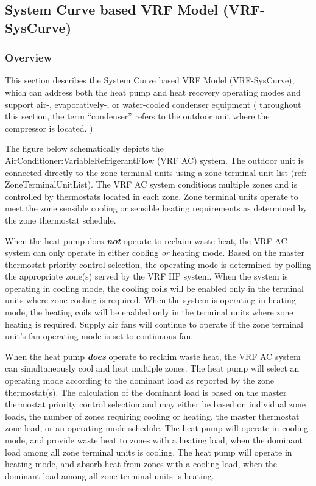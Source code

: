 \subsection{System Curve based VRF Model (VRF-SysCurve)}\label{variable-refrigerant-flow-heat-pump-model-system-curve-based-model}

\subsubsection{Overview}\label{overview-028}

This section describes the System Curve based VRF Model (VRF-SysCurve), which can address both the heat pump and heat recovery operating modes and support air-, evaporatively-, or water-cooled condenser equipment ( throughout this section, the term ``condenser'' refers to the outdoor unit where the compressor is located. )

The figure below schematically depicts the AirConditioner:VariableRefrigerantFlow (VRF AC) system. The outdoor unit is connected directly to the zone terminal units using a zone terminal unit list (ref: ZoneTerminalUnitList). The VRF AC system conditions multiple zones and is controlled by thermostats located in each zone. Zone terminal units operate to meet the zone sensible cooling or sensible heating requirements as determined by the zone thermostat schedule.

When the heat pump does \emph{\textbf{not}} operate to reclaim waste heat, the VRF AC system can only operate in either cooling \emph{or} heating mode. Based on the master thermostat priority control selection, the operating mode is determined by polling the appropriate zone(s) served by the VRF HP system. When the system is operating in cooling mode, the cooling coils will be enabled only in the terminal units where zone cooling is required. When the system is operating in heating mode, the heating coils will be enabled only in the terminal units where zone heating is required. Supply air fans will continue to operate if the zone terminal unit's fan operating mode is set to continuous fan.

When the heat pump \emph{\textbf{does}} operate to reclaim waste heat, the VRF AC system can simultaneously cool and heat multiple zones. The heat pump will select an operating mode according to the dominant load as reported by the zone thermostat(s). The calculation of the dominant load is based on the master thermostat priority control selection and may either be based on individual zone loads, the number of zones requiring cooling or heating, the master thermostat zone load, or an operating mode schedule. The heat pump will operate in cooling mode, and provide waste heat to zones with a heating load, when the dominant load among all zone terminal units is cooling. The heat pump will operate in heating mode, and absorb heat from zones with a cooling load, when the dominant load among all zone terminal units is heating.

